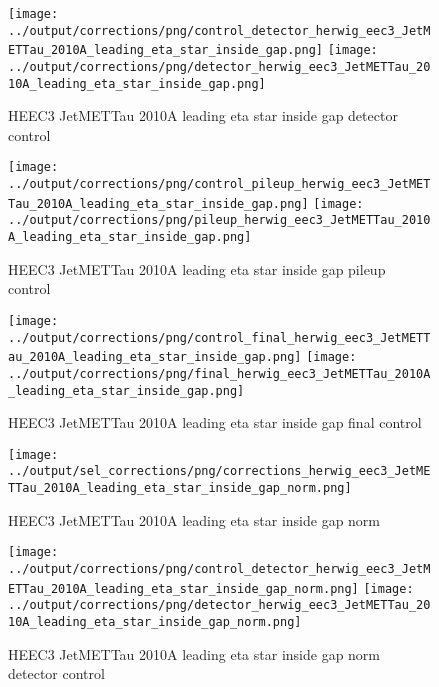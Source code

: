 \documentclass[11pt]{book}
\begin{document}
\begin{figure}[ht]
\centering
\texttt{[image: ../output/corrections/png/control\_detector\_herwig\_eec3\_JetMETTau\_2010A\_leading\_eta\_star\_inside\_gap.png]}
\texttt{[image: ../output/corrections/png/detector\_herwig\_eec3\_JetMETTau\_2010A\_leading\_eta\_star\_inside\_gap.png]}
\caption{HEEC3 JetMETTau 2010A leading eta star inside gap detector control}
\label{fig:HEEC3_JetMETTau_2010A_leading_eta_star_inside_gap_detector_control}
\end{figure}

\begin{figure}[ht]
\centering
\texttt{[image: ../output/corrections/png/control\_pileup\_herwig\_eec3\_JetMETTau\_2010A\_leading\_eta\_star\_inside\_gap.png]}
\texttt{[image: ../output/corrections/png/pileup\_herwig\_eec3\_JetMETTau\_2010A\_leading\_eta\_star\_inside\_gap.png]}
\caption{HEEC3 JetMETTau 2010A leading eta star inside gap pileup control}
\label{fig:HEEC3_JetMETTau_2010A_leading_eta_star_inside_gap_pileup_control}
\end{figure}


\begin{figure}[ht]
\centering
\texttt{[image: ../output/corrections/png/control\_final\_herwig\_eec3\_JetMETTau\_2010A\_leading\_eta\_star\_inside\_gap.png]}
\texttt{[image: ../output/corrections/png/final\_herwig\_eec3\_JetMETTau\_2010A\_leading\_eta\_star\_inside\_gap.png]}
\caption{HEEC3 JetMETTau 2010A leading eta star inside gap final control}
\label{fig:HEEC3_JetMETTau_2010A_leading_eta_star_inside_gap_final_control}
\end{figure}



\begin{figure}[ht]
\centering
\texttt{[image: ../output/sel\_corrections/png/corrections\_herwig\_eec3\_JetMETTau\_2010A\_leading\_eta\_star\_inside\_gap\_norm.png]}
\caption{HEEC3 JetMETTau 2010A leading eta star inside gap norm}
\label{fig:HEEC3_JetMETTau_2010A_leading_eta_star_inside_gap_norm}
\end{figure}

\begin{figure}[ht]
\centering
\texttt{[image: ../output/corrections/png/control\_detector\_herwig\_eec3\_JetMETTau\_2010A\_leading\_eta\_star\_inside\_gap\_norm.png]}
\texttt{[image: ../output/corrections/png/detector\_herwig\_eec3\_JetMETTau\_2010A\_leading\_eta\_star\_inside\_gap\_norm.png]}
\caption{HEEC3 JetMETTau 2010A leading eta star inside gap norm detector control}
\label{fig:HEEC3_JetMETTau_2010A_leading_eta_star_inside_gap_norm_detector_control}
\end{figure}
\end{document}
